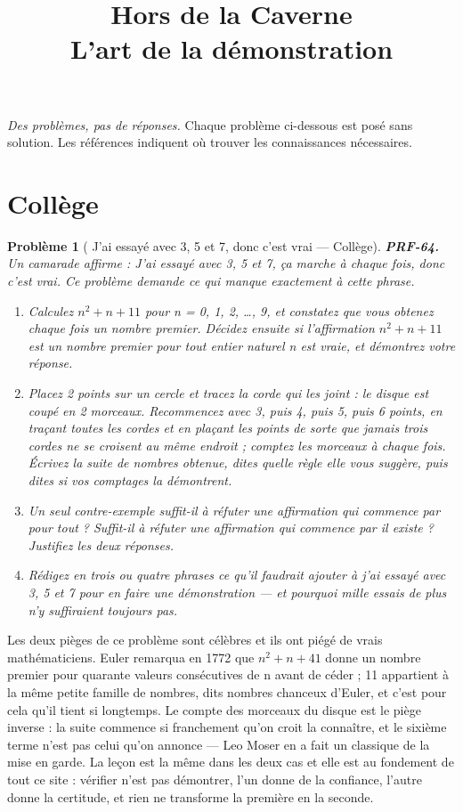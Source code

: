 \documentclass[11pt]{article}
\title{Hors de la Caverne \\ \Large L'art de la démonstration}
\author{}
\date{}
\newtheorem{problem}{Problème}
\begin{document}
\maketitle
\noindent\emph{Des problèmes, pas de réponses.} Chaque problème ci-dessous est posé
sans solution. Les références indiquent où trouver les connaissances nécessaires.
\medskip


\section*{Collège}

\begin{problem}[{\og{} J'ai essayé avec 3, 5 et 7, donc c'est vrai \fg{} --- Collège}]
\textbf{PRF-64.} Un camarade affirme : \og{} J'ai essayé avec 3, 5 et 7, ça marche à chaque
fois, donc c'est vrai. \fg{} Ce problème demande ce qui manque exactement à cette phrase.
\begin{enumerate}
\item[(a)] Calculez $ n^2 + n + 11 $ pour n = 0, 1, 2, \dots{}, 9, et constatez que vous obtenez chaque
fois un nombre premier. Décidez ensuite si l'affirmation \og{} $ n^2 + n + 11 $ est un nombre
premier pour tout entier naturel n \fg{} est vraie, et démontrez votre réponse.
\item[(b)] Placez 2 points sur un cercle et tracez la corde qui les joint : le disque est coupé en
2 morceaux. Recommencez avec 3, puis 4, puis 5, puis 6 points, en traçant toutes les cordes
et en plaçant les points de sorte que jamais trois cordes ne se croisent au même endroit ;
comptez les morceaux à chaque fois. Écrivez la suite de nombres obtenue, dites quelle règle
elle vous suggère, puis dites si vos comptages la démontrent.
\item[(c)] Un seul contre-exemple suffit-il à réfuter une affirmation qui commence par \og{} pour
tout \fg{} ? Suffit-il à réfuter une affirmation qui commence par \og{} il existe \fg{} ? Justifiez les
deux réponses.
\item[(d)] Rédigez en trois ou quatre phrases ce qu'il faudrait ajouter à \og{} j'ai essayé avec 3, 5
et 7 \fg{} pour en faire une démonstration --- et pourquoi mille essais de plus n'y suffiraient
toujours pas.
\end{enumerate}

\end{problem}

\noindent Les deux pièges de ce problème sont célèbres et ils ont piégé de vrais
mathématiciens. Euler remarqua en 1772 que $ n^2 + n + 41 $ donne un nombre premier pour
quarante valeurs consécutives de n avant de céder ; 11 appartient à la même petite famille
de nombres, dits nombres chanceux d'Euler, et c'est pour cela qu'il tient si longtemps.
Le compte des morceaux du disque est le piège inverse : la suite commence si franchement
qu'on croit la connaître, et le sixième terme n'est pas celui qu'on annonce --- Leo Moser en
a fait un classique de la mise en garde. La leçon est la même dans les deux cas et elle est
au fondement de tout ce site : vérifier n'est pas démontrer, l'un donne de la confiance,
l'autre donne la certitude, et rien ne transforme la première en la seconde.
\end{document}
